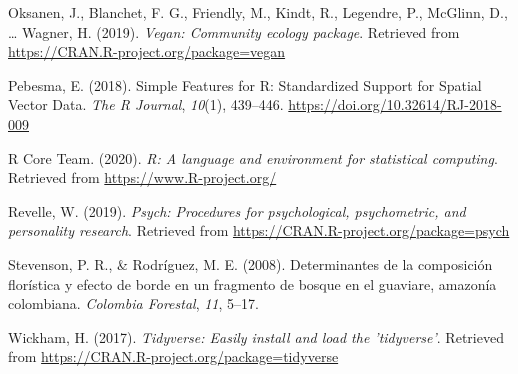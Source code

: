 \documentclass[11pt,]{article}
\begin{document}
\hypertarget{ref-VeganPack}{}
Oksanen, J., Blanchet, F. G., Friendly, M., Kindt, R., Legendre, P.,
McGlinn, D., \ldots{} Wagner, H. (2019). \emph{Vegan: Community ecology
package}. Retrieved from \url{https://CRAN.R-project.org/package=vegan}

\hypertarget{ref-sfpackage}{}
Pebesma, E. (2018). Simple Features for R: Standardized Support for
Spatial Vector Data. \emph{The R Journal}, \emph{10}(1), 439--446.
\url{https://doi.org/10.32614/RJ-2018-009}

\hypertarget{ref-RSoft}{}
R Core Team. (2020). \emph{R: A language and environment for statistical
computing}. Retrieved from \url{https://www.R-project.org/}

\hypertarget{ref-psych}{}
Revelle, W. (2019). \emph{Psych: Procedures for psychological,
psychometric, and personality research}. Retrieved from
\url{https://CRAN.R-project.org/package=psych}

\hypertarget{ref-stevenson2008determinantes}{}
Stevenson, P. R., \& Rodríguez, M. E. (2008). Determinantes de la
composición florística y efecto de borde en un fragmento de bosque en el
guaviare, amazonía colombiana. \emph{Colombia Forestal}, \emph{11},
5--17.

\hypertarget{ref-Tidyverse}{}
Wickham, H. (2017). \emph{Tidyverse: Easily install and load the
'tidyverse'}. Retrieved from
\url{https://CRAN.R-project.org/package=tidyverse}




\newpage
\singlespacing 
\end{document}
